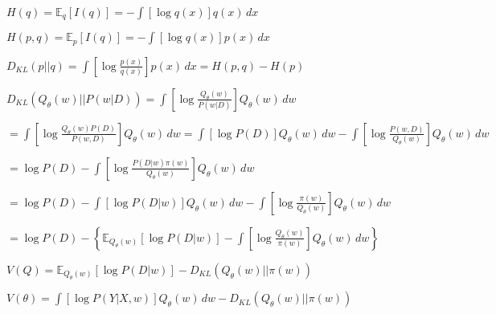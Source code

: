 \documentclass[multi={mymath},border=1pt,convert={convertexe={convert},density=300,size=800x800,outext=.png}]{standalone}
\newenvironment{mymath}{$\displaystyle}{$}
\def\E{{\mathbb{E}}}            %
\def\|{{|\!|}}
\begin{document}
\begin{mymath}
H(q) = \E_q [I(q)] = - \int [\log q(x)] q(x)\,dx
\end{mymath}

\begin{mymath}
H(p, q) = \E_p[I(q)] = - \int [\log q(x)] p(x)\,dx
\end{mymath}

\begin{mymath}
D_{KL}(p \| q) = \int \left[ \log \frac{p(x)}{q(x)} \right] p(x)\,dx = H(p, q) - H(p)
\end{mymath}

\begin{mymath}
D_{KL}(Q_{\theta}(w) \| P(w | D)) = \int \left[ \log \frac{Q_{\theta}(w)}{P(w | D)} \right] Q_{\theta}(w)\,dw
\end{mymath}

\begin{mymath}
= \int \left[ \log \frac{Q_{\theta}(w)P(D)}{P(w, D)} \right] Q_{\theta}(w)\,dw = \int \left[ \log P(D) \right] Q_{\theta}(w)\,dw - \int \left[ \log \frac{P(w, D)}{Q_{\theta}(w)} \right] Q_{\theta}(w)\,dw
\end{mymath}

\begin{mymath}
= \log P(D) - \int \left[ \log \frac{P(D | w) \pi(w)}{Q_{\theta}(w)} \right] Q_{\theta}(w)\,dw
\end{mymath}

\begin{mymath}
= \log P(D) - \int \left[ \log P(D | w) \right] Q_{\theta}(w)\,dw - \int \left[ \log \frac{\pi(w)}{Q_{\theta}(w)} \right] Q_{\theta}(w)\,dw
\end{mymath}

\begin{mymath}
= \log P(D) - \left\{  \E_{Q_{\theta}(w)}[ \log P(D | w) ] - \int \left[ \log \frac{Q_{\theta}(w)}{\pi(w)} \right] Q_{\theta}(w)\,dw \right\}
\end{mymath}

\begin{mymath}
V(Q) = \E_{Q_{\theta}(w)}[ \log P(D | w) ] - D_{KL}(Q_{\theta}(w) \| \pi(w))
\end{mymath}

\begin{mymath}
V(\theta) = \int [ \log P(Y | X, w) ] Q_{\theta}(w)\,dw - D_{KL}(Q_{\theta}(w) \| \pi(w))
\end{mymath}
\end{document}
